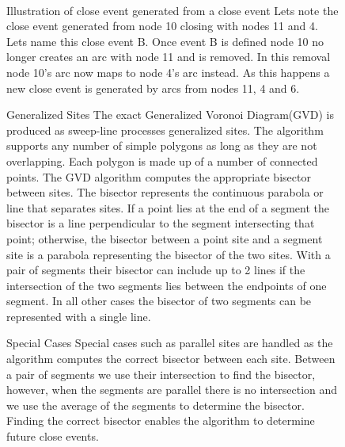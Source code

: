 \documentclass{egpubl}
\begin{document}
\begin{figure}
	\centering
	 \\
	\caption{Illustration of close event generated from a close event
		\protect{} Lets note the close event generated from node 10 closing with nodes 11 and 4. Lets name this close event B.
		\protect{} Once event B is defined node 10 no longer creates an arc with node 11 and is removed. In this removal node 10's arc now maps to node 4's arc instead. As this happens a new close event is generated by arcs from nodes 11, 4 and 6.
	}
	\label{fig:close_events}
\end{figure}


\begin{figure}
	\centering
	\caption{Generalized Sites
		\protect{} The exact Generalized Voronoi Diagram(GVD) is produced as sweep-line processes generalized sites. The algorithm supports any number of simple polygons as long as they are not overlapping. Each polygon is made up of a number of connected points. The GVD algorithm computes the appropriate bisector between sites. The bisector represents the continuous parabola or line that separates sites. If a point lies at the end of a segment the bisector is a line perpendicular to the segment intersecting that point; otherwise, the bisector between a point site and a segment site is a parabola representing the bisector of the two sites. With a pair of segments their bisector can include up to 2 lines if the intersection of the two segments lies between the endpoints of one segment. In all other cases the bisector of two segments can be represented with a single line.
	}
	\label{fig:gvd}
\end{figure}


\begin{figure}
	\centering
	\caption{Special Cases
		\protect{} Special cases such as parallel sites are handled as the algorithm computes the correct bisector between each site. Between a pair of segments we use their intersection to find the bisector, however, when the segments are parallel there is no intersection and we use the average of the segments to determine the bisector. Finding the correct bisector enables the algorithm to determine future close events. 
	}
	\label{fig:gvd}
\end{figure}
\end{document}
